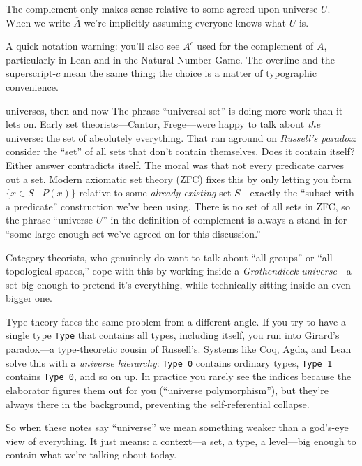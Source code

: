 \documentclass[11pt]{article}
\begin{document}
\begin{center}
\end{center}

The complement only makes sense relative to some agreed-upon universe $U$. When we write $\overline{A}$ we're implicitly assuming everyone knows what $U$ is.

A quick notation warning: you'll also see $A^c$ used for the complement of $A$, particularly in Lean and in the Natural Number Game. The overline and the superscript-$c$ mean the same thing; the choice is a matter of typographic convenience.

\begin{sidebar}{universes, then and now}
The phrase ``universal set'' is doing more work than it lets on. Early set theorists---Cantor, Frege---were happy to talk about \emph{the} universe: the set of absolutely everything. That ran aground on \emph{Russell's paradox}: consider the ``set'' of all sets that don't contain themselves. Does it contain itself? Either answer contradicts itself. The moral was that not every predicate carves out a set. Modern axiomatic set theory (ZFC) fixes this by only letting you form $\{x \in S \mid P(x)\}$ relative to some \emph{already-existing} set $S$---exactly the ``subset with a predicate'' construction we've been using. There is no set of all sets in ZFC, so the phrase ``universe $U$'' in the definition of complement is always a stand-in for ``some large enough set we've agreed on for this discussion.''

Category theorists, who genuinely do want to talk about ``all groups'' or ``all topological spaces,'' cope with this by working inside a \emph{Grothendieck universe}---a set big enough to pretend it's everything, while technically sitting inside an even bigger one.

Type theory faces the same problem from a different angle. If you try to have a single type \texttt{Type} that contains all types, including itself, you run into Girard's paradox---a type-theoretic cousin of Russell's. Systems like Coq, Agda, and Lean solve this with a \emph{universe hierarchy}: \texttt{Type 0} contains ordinary types, \texttt{Type 1} contains \texttt{Type 0}, and so on up. In practice you rarely see the indices because the elaborator figures them out for you (``universe polymorphism''), but they're always there in the background, preventing the self-referential collapse.

So when these notes say ``universe'' we mean something weaker than a god's-eye view of everything. It just means: a context---a set, a type, a level---big enough to contain what we're talking about today.
\end{sidebar}
\end{document}
